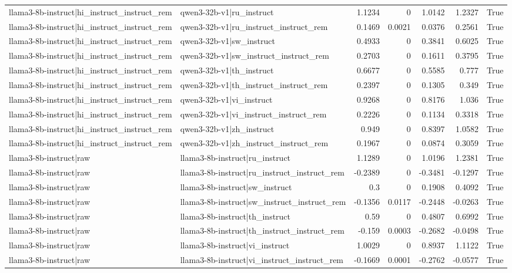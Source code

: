 \begin{table}
\begin{tabular}{l l r r r r l}
llama3-8b-instruct|hi_instruct_instruct_rem & qwen3-32b-v1|ru_instruct & 1.1234 & 0 & 1.0142 & 1.2327 & True \\
llama3-8b-instruct|hi_instruct_instruct_rem & qwen3-32b-v1|ru_instruct_instruct_rem & 0.1469 & 0.0021 & 0.0376 & 0.2561 & True \\
llama3-8b-instruct|hi_instruct_instruct_rem & qwen3-32b-v1|sw_instruct & 0.4933 & 0 & 0.3841 & 0.6025 & True \\
llama3-8b-instruct|hi_instruct_instruct_rem & qwen3-32b-v1|sw_instruct_instruct_rem & 0.2703 & 0 & 0.1611 & 0.3795 & True \\
llama3-8b-instruct|hi_instruct_instruct_rem & qwen3-32b-v1|th_instruct & 0.6677 & 0 & 0.5585 & 0.777 & True \\
llama3-8b-instruct|hi_instruct_instruct_rem & qwen3-32b-v1|th_instruct_instruct_rem & 0.2397 & 0 & 0.1305 & 0.349 & True \\
llama3-8b-instruct|hi_instruct_instruct_rem & qwen3-32b-v1|vi_instruct & 0.9268 & 0 & 0.8176 & 1.036 & True \\
llama3-8b-instruct|hi_instruct_instruct_rem & qwen3-32b-v1|vi_instruct_instruct_rem & 0.2226 & 0 & 0.1134 & 0.3318 & True \\
llama3-8b-instruct|hi_instruct_instruct_rem & qwen3-32b-v1|zh_instruct & 0.949 & 0 & 0.8397 & 1.0582 & True \\
llama3-8b-instruct|hi_instruct_instruct_rem & qwen3-32b-v1|zh_instruct_instruct_rem & 0.1967 & 0 & 0.0874 & 0.3059 & True \\
llama3-8b-instruct|raw & llama3-8b-instruct|ru_instruct & 1.1289 & 0 & 1.0196 & 1.2381 & True \\
llama3-8b-instruct|raw & llama3-8b-instruct|ru_instruct_instruct_rem & -0.2389 & 0 & -0.3481 & -0.1297 & True \\
llama3-8b-instruct|raw & llama3-8b-instruct|sw_instruct & 0.3 & 0 & 0.1908 & 0.4092 & True \\
llama3-8b-instruct|raw & llama3-8b-instruct|sw_instruct_instruct_rem & -0.1356 & 0.0117 & -0.2448 & -0.0263 & True \\
llama3-8b-instruct|raw & llama3-8b-instruct|th_instruct & 0.59 & 0 & 0.4807 & 0.6992 & True \\
llama3-8b-instruct|raw & llama3-8b-instruct|th_instruct_instruct_rem & -0.159 & 0.0003 & -0.2682 & -0.0498 & True \\
llama3-8b-instruct|raw & llama3-8b-instruct|vi_instruct & 1.0029 & 0 & 0.8937 & 1.1122 & True \\
llama3-8b-instruct|raw & llama3-8b-instruct|vi_instruct_instruct_rem & -0.1669 & 0.0001 & -0.2762 & -0.0577 & True \\

\end{tabular}
\end{table}
